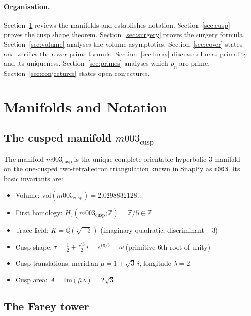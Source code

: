 \documentclass[11pt,a4paper]{article}
\theoremstyle{definition}
\newcommand{\ZZ}{\mathbb{Z}}
\newcommand{\QQ}{\mathbb{Q}}
\newcommand{\Zfive}{\ZZ/5}
\newcommand{\vol}{\mathrm{vol}}
\newcommand{\Mcusp}{m003_{\mathrm{cusp}}}
\begin{document}
\paragraph{Organisation.}
Section~\ref{sec:manifolds} reviews the manifolds and
establishes notation.
Section~\ref{sec:cusp} proves the cusp shape theorem.
Section~\ref{sec:surgery} proves the surgery formula.
Section~\ref{sec:volume} analyses the volume asymptotics.
Section~\ref{sec:cover} states and verifies the cover prime formula.
Section~\ref{sec:lucas} discusses Lucas-primality and its uniqueness.
Section~\ref{sec:primes} analyses which $p_n$ are prime.
Section~\ref{sec:conjectures} states open conjectures.

\section{Manifolds and Notation}
\label{sec:manifolds}

\subsection{The cusped manifold \texorpdfstring{$\Mcusp$}{m003}}

The manifold $\Mcusp$ is the unique complete orientable hyperbolic
3-manifold on the one-cusped two-tetrahedron triangulation known
in SnapPy as \texttt{m003}.
Its basic invariants are:
\begin{itemize}
\item Volume: $\vol(\Mcusp) = 2.0298832128\ldots$
\item First homology: $H_1(\Mcusp;\ZZ) = \Zfive \oplus \ZZ$
\item Trace field: $K = \QQ(\sqrt{-3})$
  (imaginary quadratic, discriminant $-3$)
\item Cusp shape: $\tau = \frac{1}{2}+\frac{\sqrt{3}}{2}i
  = e^{i\pi/3} = \omega$ (primitive 6th root of unity)
\item Cusp translations: meridian $\mu = 1+\sqrt{3}\,i$,
  longitude $\lambda = 2$
\item Cusp area: $A = \mathrm{Im}(\bar\mu\lambda) = 2\sqrt{3}$
\end{itemize}

\subsection{The Farey tower}
\end{document}
